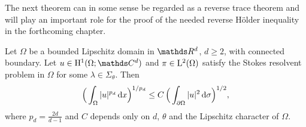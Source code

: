 The next theorem can in some sense be regarded as a reverse trace theorem and will play an important role for the proof of the needed reverse H\"{o}lder inequality in the forthcoming chapter.

\begin{thm}
  \label{thm:reverseTrace}
  Let $\Omega$ be a bounded Lipschitz domain in $\R^d$, $d \geq 2$, with connected boundary.
  Let $u \in \HH^1(\Omega; \C^d)$ and $\pi \in \mathrm{L}^2(\Omega)$ satisfy the Stokes resolvent problem in $\Omega$ for some $\lambda \in \Sigma_\theta$.
  Then
  \begin{align}
    \label{eq:reverseTrace}
    \Big( \int_\Omega |u|^{p_d} \, {\operatorname{d}\!{x}} \Big)^{1/{p_d}} \leq C\, \Big( \int_{\partial\Omega} |u|^2 \, {\operatorname{d}\!{\sigma}} \Big)^{1/2},
  \end{align}
  where $p_d = \frac{2d}{d - 1}$ and $C$ depends only on $d$, $\theta$ and the Lipschitz character of $\Omega$.
\end{thm}

